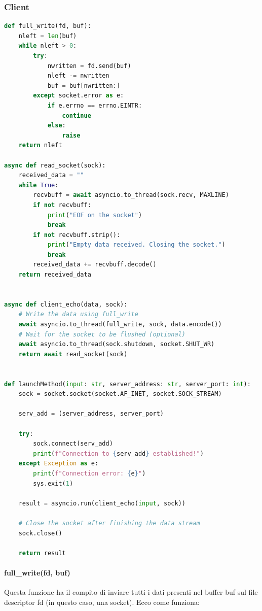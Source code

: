 \documentclass{article}
\begin{document}
\subsubsection{Client}
\begin{lstlisting}[language=python,firstnumber=1]
def full_write(fd, buf):
    nleft = len(buf)
    while nleft > 0:
        try:
            nwritten = fd.send(buf)
            nleft -= nwritten
            buf = buf[nwritten:]
        except socket.error as e:
            if e.errno == errno.EINTR:
                continue
            else:
                raise
    return nleft

async def read_socket(sock):
    received_data = ""
    while True:
        recvbuff = await asyncio.to_thread(sock.recv, MAXLINE)
        if not recvbuff:
            print("EOF on the socket")
            break
        if not recvbuff.strip():
            print("Empty data received. Closing the socket.")
            break
        received_data += recvbuff.decode()
    return received_data


async def client_echo(data, sock):
    # Write the data using full_write
    await asyncio.to_thread(full_write, sock, data.encode())
    # Wait for the socket to be flushed (optional)
    await asyncio.to_thread(sock.shutdown, socket.SHUT_WR)
    return await read_socket(sock)


def launchMethod(input: str, server_address: str, server_port: int):
    sock = socket.socket(socket.AF_INET, socket.SOCK_STREAM)

    serv_add = (server_address, server_port)

    try:
        sock.connect(serv_add)
        print(f"Connection to {serv_add} established!")
    except Exception as e:
        print(f"Connection error: {e}")
        sys.exit(1)

    result = asyncio.run(client_echo(input, sock))

    # Close the socket after finishing the data stream
    sock.close()

    return result
\end{lstlisting}
\paragraph{full\_write(fd, buf)}
Questa funzione ha il compito di inviare tutti i dati presenti nel buffer buf sul file descriptor fd (in questo caso, una socket). Ecco come funziona:
\end{document}
